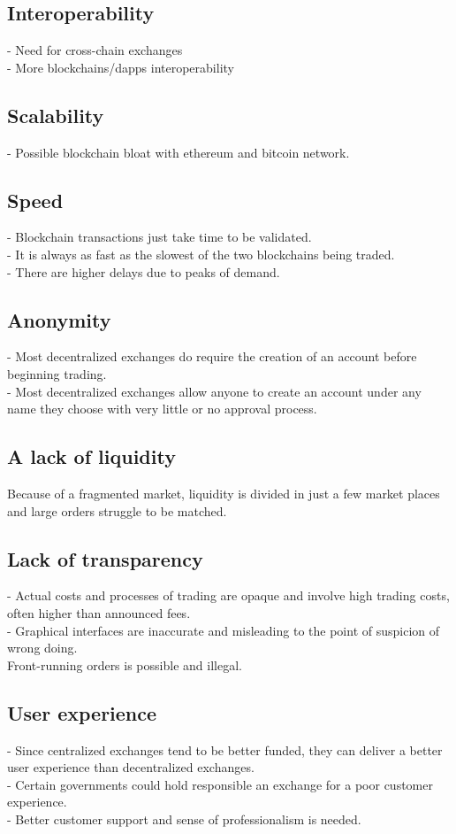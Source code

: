 \documentclass[]{article}
\begin{document}
	\subsection{Interoperability}
	- Need for cross-chain exchanges  \\
	- More blockchains/dapps interoperability\\
	\subsection{Scalability}
	- Possible blockchain bloat with ethereum and bitcoin network.  
	\subsection{Speed}
	- Blockchain transactions just take time to be validated.\\ 
	- It is always as fast as the slowest of the two blockchains being traded.\\
	- There are higher delays due to peaks of demand.
	\subsection{Anonymity}
	- Most decentralized exchanges do require the creation of an account before beginning trading.\\ 
	- Most decentralized exchanges allow anyone to create an account under any name they choose with very little or no approval process.\\
	\subsection{A lack of liquidity}	
	Because of a fragmented market, liquidity is divided in just a few market places and large orders struggle to be matched.
	\subsection{Lack of transparency}
	- Actual costs and processes of trading are opaque and involve high trading costs, often higher than announced fees.\\ 
	- Graphical interfaces are inaccurate and misleading to the point of suspicion of wrong doing.\\
	Front-running orders is possible and illegal.
	\subsection{User experience}
	- Since centralized exchanges tend to be better funded, they can deliver a better user experience than decentralized exchanges.\\ 
	- Certain governments could hold responsible an exchange for a poor customer experience.\\
	- Better customer support and sense of professionalism is needed.
	
\end{document}
